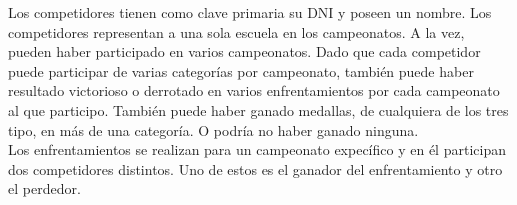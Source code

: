 Los competidores tienen como clave primaria su DNI y poseen un nombre. Los competidores representan a una sola escuela en
los campeonatos. A la vez, pueden haber participado en varios campeonatos. Dado que cada competidor puede participar
de varias categorías por campeonato, también puede haber resultado victorioso o derrotado en varios enfrentamientos por
cada campeonato al que participo. También puede haber ganado medallas, de cualquiera de los tres tipo, en más de una categoría.
O podría no haber ganado ninguna.\\

Los enfrentamientos se realizan para un campeonato expecífico y en él participan dos competidores distintos. Uno de estos
es el ganador del enfrentamiento y otro el perdedor.
